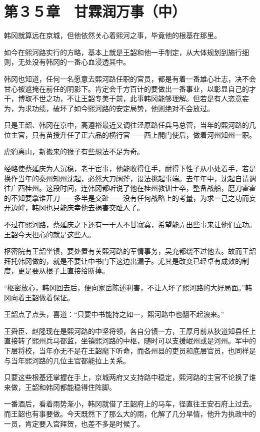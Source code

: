 \section{第３５章　甘霖润万事（中）}

韩冈就算远在京城，但他依然关心着熙河之事，毕竟他的根基在那里。

如今在熙河路实行的方略，基本上就是王韶和他一手制定，从大体规划到施行细则，无处没有韩冈的一番心血浸透其中。

韩冈也知道，任何一名愿意去熙河路任职的官员，都是有着一番雄心壮志，决不会甘心被遮掩在前任的阴影下。肯定会千方百计的要做出一番事业，以彰显自己的才干，博取不世之功，不让王韶专美于前，此事韩冈能够理解。但若是有人恣意妄为，为求功绩，破坏了如今熙河路的安定局势，他则绝对不会放过。

只是王韶、韩冈在京中，高遵裕最近又调往泾原路任兵马总管，当年的熙河路的几位主官，只有苗授升任了正六品的横行官——西上閣门使后，做着河州知州一职。

虎豹离山，新搬来的猴子有些想法不足为奇。

经略使蔡延庆为人沉稳，老于宦事，他能收得住手，耐得下性子从小处着手，若是换作当年的秦州知州沈起，必然大刀阔斧，设法挑起事端。去年年中，沈起自请调往广西桂州。这段时间，连韩冈都听说了他在桂州教训士卒，整备战船，磨刀霍霍的不知要拿谁开刀——多半是交趾——没有任何战略上的考量，为求一己之功而妄开边衅，韩冈也只能庆幸他去祸害交趾人了。

不过在熙河路，蔡延庆之下还有一干人不甘寂寞，希望能弄出些事来让他们立功。王韶今天担心的就是这些人。

枢密院有王韶坐镇，要处置有关熙河路的军情事务，吴充都绕不过他去。故而王韶拜托韩冈做的，就是不要让中书门下这边出漏子。尤其是改变已经卓有成效的制度，更是要从根子上直接给断掉。

“枢密放心，韩冈回去后，便向家岳陈述利害，不让人坏了熙河路的大好局面。”韩冈向着王韶做着保证。

王韶点了点头，喜道：“只要中书能持之如一，熙河路中也翻不起浪来。”

王舜臣、赵隆现在是熙河路的中坚将领，各自分镇一方，王厚月前从狄道知县任上直接转了熙州兵马都监，坐镇熙河路的中枢，随时可以支援岷州或是河州。军中的下层将校，当年亦无不是在王韶麾下听命，而各州县的吏员和底层官员，也同样是与当年熙河路的几位主官都能拉上关系。

只要这些根基还掌握在手上，京城两府又支持路中稳定，熙河路的主官不论换了谁来做，王韶和韩冈都能稳得住阵脚。

一番酒后，看着雨势渐小，韩冈就借了王韶府上的马车，径直往王安石府上过去。而王韶也有事要做。今天既然下了那么大的雨，化解了几分旱情，他升为执政中的一员，肯定要入宫拜贺，也差不多是时候了。

